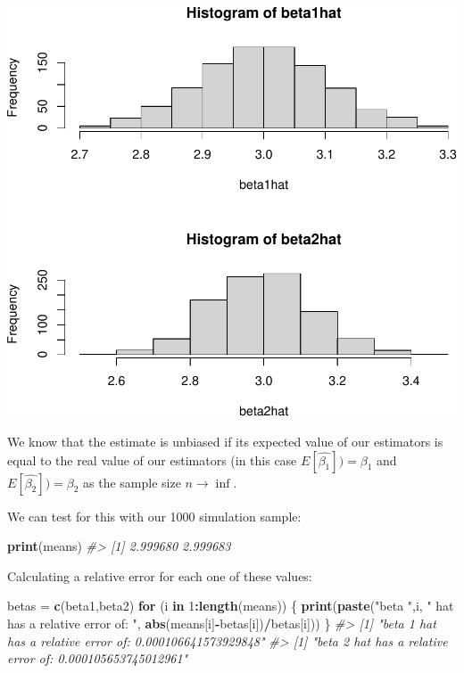 \documentclass[]{article}
\newenvironment{Shaded}{\begin{snugshade}}{\end{snugshade}}
\newcommand{\CommentTok}[1]{\textcolor[rgb]{0.56,0.35,0.01}{\textit{#1}}}
\newcommand{\ControlFlowTok}[1]{\textcolor[rgb]{0.13,0.29,0.53}{\textbf{#1}}}
\newcommand{\DecValTok}[1]{\textcolor[rgb]{0.00,0.00,0.81}{#1}}
\newcommand{\KeywordTok}[1]{\textcolor[rgb]{0.13,0.29,0.53}{\textbf{#1}}}
\newcommand{\NormalTok}[1]{#1}
\newcommand{\OperatorTok}[1]{\textcolor[rgb]{0.81,0.36,0.00}{\textbf{#1}}}
\newcommand{\StringTok}[1]{\textcolor[rgb]{0.31,0.60,0.02}{#1}}
\begin{document}
\includegraphics{./figures/unnamed-chunk-4-1.pdf}

We know that the estimate is unbiased if its expected value of our
estimators is equal to the real value of our estimators (in this case
\(E[ \hat{\beta_{1}}]) = \beta_{1}\) and
\(E[ \hat{\beta_{2}}]) = \beta_{2}\) as the sample size
\(n \rightarrow \inf\).

We can test for this with our 1000 simulation sample:

\begin{Shaded}
\begin{Highlighting}[]
\KeywordTok{print}\NormalTok{(means)}
\CommentTok{#> [1] 2.999680 2.999683}
\end{Highlighting}
\end{Shaded}

Calculating a relative error for each one of these values:

\begin{Shaded}
\begin{Highlighting}[]
\NormalTok{betas =}\StringTok{ }\KeywordTok{c}\NormalTok{(beta1,beta2)}
\ControlFlowTok{for}\NormalTok{ (i }\ControlFlowTok{in} \DecValTok{1}\OperatorTok{:}\KeywordTok{length}\NormalTok{(means)) \{}
    \KeywordTok{print}\NormalTok{(}\KeywordTok{paste}\NormalTok{(}\StringTok{"beta "}\NormalTok{,i, }\StringTok{" hat has a relative error of: "}\NormalTok{, }\KeywordTok{abs}\NormalTok{(means[i]}\OperatorTok{-}\NormalTok{betas[i])}\OperatorTok{/}\NormalTok{betas[i]))}
\NormalTok{\}   }
\CommentTok{#> [1] "beta  1  hat has a relative error of:  0.000106641573929848"}
\CommentTok{#> [1] "beta  2  hat has a relative error of:  0.000105653745012961"}
\end{Highlighting}
\end{Shaded}
\end{document}
